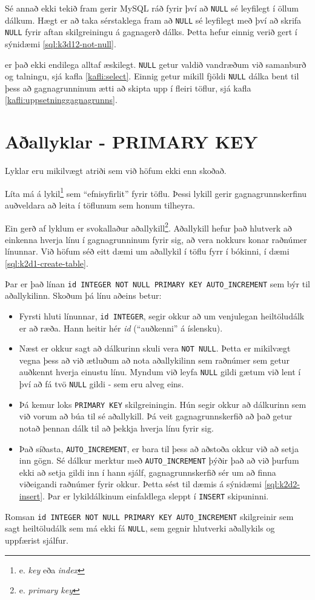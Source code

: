 Sé annað ekki tekið fram gerir MySQL ráð fyrir því að \verb|NULL| sé leyfilegt í öllum dálkum. Hægt er að taka sérstaklega fram að \verb|NULL| sé leyfilegt með því að skrifa \verb|NULL| fyrir aftan skilgreiningu á gagnagerð dálks. Þetta hefur einnig verið gert í sýnidæmi \ref{sql:k3d12-not-null}.

er það ekki endilega alltaf æskilegt. \verb|NULL| getur valdið vandræðum við samanburð og talningu, sjá kafla \ref{kafli:select}. Einnig getur mikill fjöldi \verb|NULL| dálka bent til þess að gagnagrunninum ætti að skipta upp í fleiri töflur, sjá kafla \ref{kafli:uppsetninggagnagrunns}.

\section{Aðallyklar - PRIMARY KEY} %
\label{undirkafli:adallyklar-kynning}
Lyklar eru mikilvægt atriði sem við höfum ekki enn skoðað.

Líta má á lykil\footnote{e. \emph{key} eða \emph{index}} sem ``efnisyfirlit'' fyrir töflu. Þessi lykill gerir gagnagrunnskerfinu auðveldara að leita í töflunum sem honum tilheyra.

Ein gerð af lyklum er svokallaður aðallykill\footnote{e. \emph{primary key}}. Aðallykill hefur það hlutverk að einkenna hverja línu í gagnagrunninum fyrir sig, að vera nokkurs konar raðnúmer línunnar. Við höfum séð eitt dæmi um aðallykil í töflu fyrr í bókinni, í dæmi \ref{sql:k2d1-create-table}.

Þar er það línan \verb|id INTEGER NOT NULL PRIMARY KEY AUTO_INCREMENT| sem býr til aðallykilinn. Skoðum þá línu aðeins betur:

\begin{itemize}
 \item Fyrsti hluti línunnar, \verb|id INTEGER|, segir okkur að um venjulegan heiltöludálk er að ræða. Hann heitir hér \emph{id} (``auðkenni'' á íslensku). 
 \item Næst er okkur sagt að dálkurinn skuli vera \verb|NOT NULL|. Þetta er mikilvægt vegna þess að við ætluðum að nota aðallykilinn sem raðnúmer sem getur auðkennt hverja einustu línu. Myndum við leyfa \verb|NULL| gildi gætum við lent í því að fá tvö \verb|NULL| gildi - sem eru alveg eins.
 \item Þá kemur loks \verb|PRIMARY KEY| skilgreiningin. Hún segir okkur að dálkurinn sem við vorum að búa til sé aðallykill. Þá veit gagnagrunnskerfið að það getur notað þennan dálk til að þekkja hverja línu fyrir sig.
 \item Það síðasta, \verb|AUTO_INCREMENT|, er bara til þess að aðstoða okkur við að setja inn gögn. Sé dálkur merktur með \verb|AUTO_INCREMENT| þýðir það að við þurfum ekki að setja gildi inn í hann sjálf, gagnagrunnskerfið sér um að finna viðeigandi raðnúmer fyrir okkur. Þetta sést til dæmis á sýnidæmi \ref{sql:k2d2-insert}. Þar er lykildálkinum einfaldlega sleppt í \verb|INSERT| skipuninni.
\end{itemize} 
Romsan \verb|id INTEGER NOT NULL PRIMARY KEY AUTO_INCREMENT| skilgreinir sem sagt heiltöludálk sem má ekki fá \verb|NULL|, sem gegnir hlutverki aðallykils og uppfærist sjálfur.

